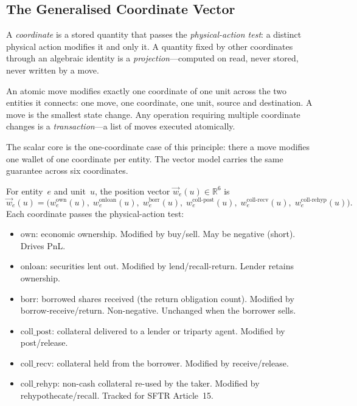 \subsection{The Generalised Coordinate Vector}
\label{sec:position-vector}

A \emph{coordinate} is a stored quantity that passes the \emph{physical-action test}: a distinct physical action modifies it and only it. A quantity fixed by other coordinates through an algebraic identity is a \emph{projection}---computed on read, never stored, never written by a move.

\begin{principle}
\label{princ:single-coord}
An atomic move modifies exactly one coordinate of one unit across the two entities it connects: one move, one coordinate, one unit, source and destination. A move is the smallest state change. Any operation requiring multiple coordinate changes is a \emph{transaction}---a list of moves executed atomically.
\end{principle}

The scalar core is the one-coordinate case of this principle: there a move modifies one wallet of one coordinate per entity. The vector model carries the same guarantee across six coordinates.

\begin{definition}
\label{def:position-vector-gpm}
For entity~$e$ and unit~$u$, the position vector $\vec{w}_e(u) \in \mathbb{R}^6$ is
\[
\vec{w}_e(u) = \bigl(
  w^{\mathrm{own}}_e(u),\;
  w^{\mathrm{onloan}}_e(u),\;
  w^{\mathrm{borr}}_e(u),\;
  w^{\mathrm{coll\text{-}post}}_e(u),\;
  w^{\mathrm{coll\text{-}recv}}_e(u),\;
  w^{\mathrm{coll\text{-}rehyp}}_e(u)
\bigr).
\]
Each coordinate passes the physical-action test:
\begin{itemize}[nosep]
\item $\mathrm{own}$: economic ownership. Modified by buy/sell. May be negative (short). Drives PnL.
\item $\mathrm{onloan}$: securities lent out. Modified by lend\slash recall-return. Lender retains ownership.
\item $\mathrm{borr}$: borrowed shares received (the return obligation count). Modified by borrow-receive\slash return. Non-negative. Unchanged when the borrower sells.
\item $\mathrm{coll\_post}$: collateral delivered to a lender or triparty agent. Modified by post\slash release.
\item $\mathrm{coll\_recv}$: collateral held from the borrower. Modified by receive\slash release.
\item $\mathrm{coll\_rehyp}$: non-cash collateral re-used by the taker. Modified by rehypothecate/recall. Tracked for SFTR Article~15.
\end{itemize}
\end{definition}

